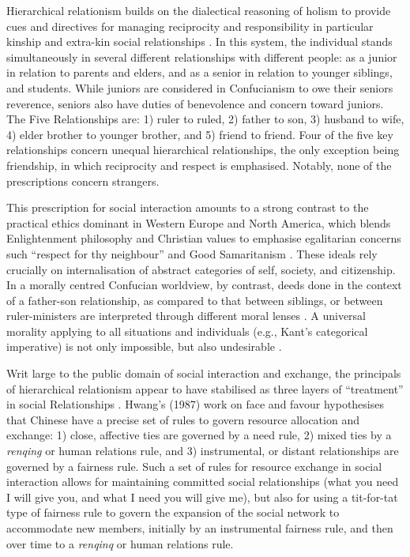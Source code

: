 \begin{CJK}{UTF8}{gbsn}
Hierarchical relationism builds on the dialectical reasoning of holism to provide cues and directives for managing reciprocity and responsibility in particular kinship and extra-kin social relationships \citep[\textit{renqing} 人情][]{Maehr1980}.  In this system, the individual stands simultaneously in several different relationships with different people: as a junior in relation to parents and elders, and as a senior in relation to younger siblings, and students. While juniors are considered in Confucianism to owe their seniors reverence, seniors also have duties of benevolence and concern toward juniors. The Five Relationships are: 1) ruler to ruled, 2) father to son, 3) husband to wife, 4) elder brother to younger brother, and 5) friend to friend. Four of the five key relationships concern unequal hierarchical relationships, the only exception being friendship, in which reciprocity and respect is emphasised.  Notably, none of the prescriptions concern strangers.

This prescription for social interaction amounts to a strong contrast to the practical ethics dominant in Western Europe and North America, which blends Enlightenment philosophy and Christian values to emphasise egalitarian concerns such ``respect for thy neighbour'' and Good Samaritanism \citep{Liu2005}.  These ideals rely crucially on internalisation of abstract categories of self, society, and citizenship.  In a morally centred Confucian worldview, by contrast, deeds done in the context of a father-son relationship, as compared to that between siblings, or between ruler-ministers are interpreted through different moral lenses \citep{Liu2011}.  A universal morality applying to all situations and individuals (e.g., Kant’s categorical imperative) is not only impossible, but also undesirable \citep{Bedford2003}.

Writ large to the public domain of social interaction and exchange, the principals of hierarchical relationism appear to have stabilised as three layers of ``treatment'' in social Relationships \citep{Liu 2009}.  Hwang’s (1987) work on face and favour hypothesises that Chinese have a precise set of rules to govern resource allocation and exchange: 1) close, affective ties are governed by a need rule, 2) mixed ties by a \textit{renqing} or human relations rule, and 3) instrumental, or distant relationships are governed by a fairness rule.  Such a set of rules for resource exchange in social interaction allows for maintaining committed social relationships (what you need I will give you, and what I need you will give me), but also for using a tit-for-tat type of fairness rule to govern the expansion of the social network to accommodate new members, initially by an instrumental fairness rule, and then over time to a \textit{renqinq} or human relations rule.



\end{CJK}
